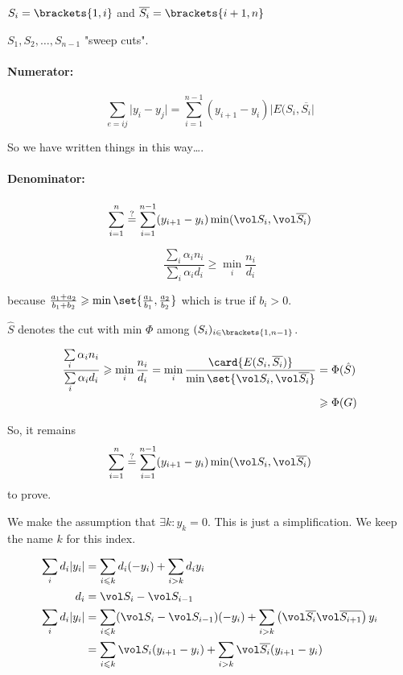 \documentclass[12pt]{article}
\begin{document}
\begin{notation}
    $S_i = \brackets{1,i}$ and $\overline{S_i} = \brackets{i+1,n}$
\end{notation}

$S_1, S_2,\ldots, S_{n-1}$ "sweep cuts".

\paragraph{Numerator:}

\[
    \sum\limits_{e=ij} \lvert y_i-y_j \rvert = \sum\limits_{i=1}^{n-1} (y_{i+1} - y_i) \lvert E(S_i, \overline{S_i} \rvert
\]

So we have written things in this way\dots.

\paragraph{Denominator:}


\[
    \sum\limits_{i=1}^n \overset{?}{=} \sum\limits_{i=1}^{n-1} (y_{i+1} - y_i) \min(\vol S_i, \vol \overline{S_i})
\]

\[
    \frac{\sum\limits_i \alpha_i n_i}{\sum\limits_i \alpha_i d_i} \geqslant \min\limits_i \frac{n_i}{d_i}
\]

because $\frac{a_1+a_2}{b_1+b_2} \geqslant \min\set{\frac{a_1}{b_1},\frac{a_2}{b_2}}$ which is true if $b_i > 0$.


$\hat{S}$ denotes the cut with min $\Phi$ among $(S_i)_{i\in\brackets{1,n-1}}$.


\[
    \begin{aligned}
        \frac{\sum\limits_i \alpha_i n_i}{\sum\limits_i \alpha_i d_i} \geqslant \min\limits_i \frac{n_i}{d_i} = \min_i \frac{\card{E(S_i,\overline{S_i})}}{\min\set{\vol S_i,\vol \overline{S_i}}} &= \Phi(\hat{S})\\
        &\geqslant \Phi(G)
    \end{aligned}
\]

So, it remains 
\[
    \sum\limits_{i=1}^n \overset{?}{=} \sum\limits_{i=1}^{n-1} (y_{i+1} - y_i) \min(\vol S_i, \vol \overline{S_i})
\]
to prove.



We make the assumption that $\exists k : y_k = 0$. This is just a simplification. We keep the name $k$ for this index.

\[
    \begin{aligned}
        \sum\limits_i d_i\lvert y_i \rvert &= \sum\limits_{i\leqslant k} d_i(-y_i) + \sum\limits_{i > k}d_i y_i\\
       d_i &= \vol S_i - \vol S_{i-1}\\
       \sum\limits_i d_i\lvert y_i \rvert &= \sum\limits_{i\leqslant k} (\vol S_i - \vol S_{i-1})(-y_i) + \sum\limits_{i>k} \left(\vol \overline{S_i} \vol \overline{S_{i+1}} \right)y_i\\
       &= \sum\limits_{i\leqslant k} \vol S_i (y_{i+1} -y_i) + \sum\limits_{i>k} \vol \overline{S_i} (y_{i+1} - y_i)
    \end{aligned}
\]
\end{document}
